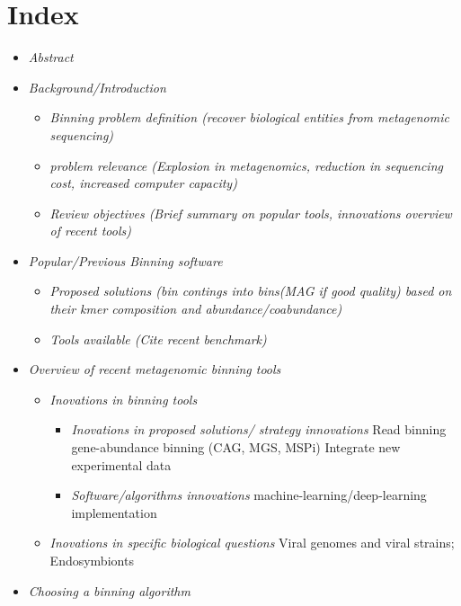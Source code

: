 \documentclass{article}
\begin{document}
\section*{Index}
\begin{itemize}
\item\emph{Abstract} 
\item\emph{Background/Introduction} 
          \begin{itemize}
	  	\item\emph{Binning problem definition      (recover biological entities from metagenomic sequencing)} 
          	\item\emph{problem relevance       (Explosion in metagenomics, reduction in sequencing cost, increased computer capacity)} 
          	\item\emph{Review objectives       (Brief summary on popular tools, innovations overview of recent tools)} 
	  \end{itemize}
 \item\emph{Popular/Previous Binning software} 
 	\begin{itemize}
         	\item\emph{Proposed solutions      (bin contings into bins(MAG if good quality) based on their kmer composition and                              abundance/coabundance)} 
         	\item\emph{Tools available (Cite recent benchmark)} 
	\end{itemize}   
\item\emph{Overview of recent metagenomic binning tools} 
          \begin{itemize}
	  	\item\emph{Inovations in binning tools}
	  	\begin{itemize}
                	 \item\emph{Inovations in proposed solutions/ strategy innovations} 
                         Read binning 
 		   	 gene-abundance binning (CAG, MGS, MSPi)
                         Integrate new experimental data 
                 	\item\emph{Software/algorithms innovations} 
                         machine-learning/deep-learning implementation
		\end{itemize}
           \item\emph{Inovations in specific biological questions} 
                 Viral genomes and viral strains; 
                 Endosymbionts 
           \end{itemize}     
 \item\emph{Choosing a binning algorithm} 

\end{itemize}
\end{document}
